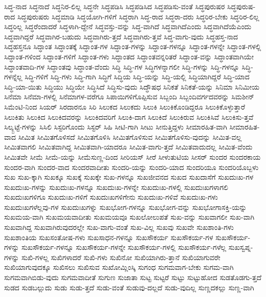 {ಸಿದ್ಧ-ನಾದ
ಸಿದ್ಧನಾದೆ
ಸಿದ್ಧನಿರ-ಲಿಲ್ಲ
ಸಿದ್ಧನೇ
ಸಿದ್ಧಪಡಿಸಿ
ಸಿದ್ಧಪಡಿಸಿದ
ಸಿದ್ಧಪಡಿಸು-ವಂತೆ
ಸಿದ್ಧಪುರುಷರ
ಸಿದ್ಧಪುರುಷ-ರಾದ
ಸಿದ್ಧಪುರುಷರು
ಸಿದ್ಧಮಾಡಿ
ಸಿದ್ಧಯೋಗಿ-ಗಳಿಗೆ
ಸಿದ್ಧರಾಗಿ
ಸಿದ್ಧ-ರಾದ
ಸಿದ್ಧರಾ-ದರು
ಸಿದ್ಧರಿರ-ಬೇಕು
ಸಿದ್ಧರಿರ-ಲಿಲ್ಲ
ಸಿದ್ಧರಿಲ್ಲ
ಸಿದ್ಧರೆಂದಾದರೆ
ಸಿದ್ಧಳಾಗಿ-ದ್ದೇನೆ
ಸಿದ್ಧವಸ್ತು-ವನ್ನು
ಸಿದ್ಧ-ವಾಗಿದೆ
ಸಿದ್ಧವಾಗಿದೆಎಂದು
ಸಿದ್ಧವಾಗಿದೆಯೆಎಂದು
ಸಿದ್ಧವಾಗಿದ್ದರೆ
ಸಿದ್ಧವಾಗಿರ-ಬಹುದು
ಸಿದ್ಧವಾಗಿರು-ತ್ತದೆ
ಸಿದ್ಧವಾಗಿರು-ತ್ತವೆ
ಸಿದ್ಧ-ವಾಗು-ವುದು
ಸಿದ್ಧಹಸ್ತ-ನಾದ
ಸಿದ್ಧಹಸ್ತನೂ
ಸಿದ್ಧಾಂತ
ಸಿದ್ಧಾಂತಕ್ಕೆ
ಸಿದ್ಧಾಂತ-ಗಳ
ಸಿದ್ಧಾಂತ-ಗಳನ್ನು
ಸಿದ್ಧಾಂತ-ಗಳನ್ನೂ
ಸಿದ್ಧಾಂತ-ಗಳನ್ನೇ
ಸಿದ್ಧಾಂತ-ಗಳಲ್ಲಿ
ಸಿದ್ಧಾಂತ-ಗಳಿಂದ
ಸಿದ್ಧಾಂತ-ಗಳಿಗೆ
ಸಿದ್ಧಾಂತ-ಗಳು
ಸಿದ್ಧಾಂತದ
ಸಿದ್ಧಾಂತವನ್ನರಿತರೆ
ಸಿದ್ಧಾಂತ-ವನ್ನು
ಸಿದ್ಧಾಂತವಾಗಿಯೇ
ಸಿದ್ಧಾಂತವಾದಿ-ಗಳ
ಸಿದ್ಧಾಂತವು
ಸಿದ್ಧಾಂತ-ವೆಂದು
ಸಿದ್ಧಿ
ಸಿದ್ಧಿ-ಗಳ
ಸಿದ್ಧಿಗಳನ್ನಾಗಲೀ
ಸಿದ್ಧಿ-ಗಳನ್ನು
ಸಿದ್ಧಿ-ಗಳನ್ನೂ
ಸಿದ್ಧಿ-ಗಳನ್ನೆಲ್ಲ
ಸಿದ್ಧಿ-ಗಳಿಗೆ
ಸಿದ್ಧಿ-ಗಳು
ಸಿದ್ಧಿ-ಗಾಗಿ
ಸಿದ್ಧಿಗೆ
ಸಿದ್ಧಿಯ
ಸಿದ್ಧಿ-ಯನ್ನು
ಸಿದ್ಧಿ-ಯಲ್ಲಿ
ಸಿದ್ಧಿಯಾಗಿದ್ದರೆ
ಸಿದ್ಧಿ-ಯಾದ
ಸಿದ್ಧಿ-ಯಾ-ಯಿತು
ಸಿದ್ಧಿಯು
ಸಿದ್ಧಿಯೇ
ಸಿದ್ಧಿಸಿದೆ
ಸಿದ್ಧಿಸು-ವುದು
ಸಿದ್ಧೌಷಧ
ಸಿನಿಕತೆ
ಸಿನಿಕತೆ-ಯನ್ನು
ಸಿನಿಮಾ
ಸಿನಿಮೀಯ
ಸಿನೆಮಾ
ಸಿನೆಮಾ-ಗಳಲ್ಲಿ
ಸಿನೆಮಾಗಳ-ವರೆಗೂ
ಸಿಪಾಯಿಗಳಿಗೊಪ್ಪಿಸುವ
ಸಿಬ್ಬಂದಿ
ಸಿಬ್ಬಂದಿವರ್ಗದವರನ್ನು
ಸಿಮಶೀನ್
ಸಿಮೆಂಟಿ-ನಿಂದ
ಸಿಯರ್
ಸಿರದಾರನೂ
ಸಿರಿ
ಸಿಲುಕದ
ಸಿಲುಕದು
ಸಿಲುಕಿ
ಸಿಲುಕಿಕೊಂಡಿದ್ದರೂ
ಸಿಲುಕಿಕೊಳ್ಳುತ್ತಾರೆ
ಸಿಲುಕಿತು
ಸಿಲುಕಿದ
ಸಿಲುಕಿದವರನ್ನು
ಸಿಲುಕಿದವರಿಗೆ
ಸಿಲುಕಿ-ದಾಗ
ಸಿಲುಕಿದೆ
ಸಿಲುಕಿರುವ
ಸಿಲುಕಿಸಿವೆ
ಸಿಲುಕಿಸು-ತ್ತವೆ
ಸಿಲ್ಕ್ಬಟ್ಟೆ-ಗಳನ್ನು
ಸಿಸಿಲಿ
ಸಿಸ್ಟರಿಗೊಂದು
ಸಿಸ್ಟರ್
ಸಿಹಿ
ಸೀಟಿ-ಗಾಗಿ
ಸೀಟು
ಸೀನುತ್ತಿದ್ದಳು
ಸೀಮಾರಹಿತ-ವಾಗಿ
ಸೀಮಾರಹಿತ-ವಾದ
ಸೀಮಿತ
ಸೀಮಿತಗೊಳಿಸದೆ
ಸೀಮಿತಗೊಳಿಸಿ
ಸೀಮಿತಗೊಳಿಸುವ
ಸೀಮಿತಗೊಳಿಸು-ವುದನ್ನು
ಸೀಮಿತ-ವಲ್ಲ
ಸೀಮಿತವಾಗಲಿ
ಸೀಮಿತವಾಗಿದ್ದ
ಸೀಮಿತವಾಗಿ-ಯಾದರೂ
ಸೀಮಿತ-ವಾಗು-ತ್ತದೆ
ಸೀಮಿತವಾದುದಲ್ಲ
ಸೀಮಿತ-ವೆಂದು
ಸೀಮಿತವೇ
ಸೀಮೆ
ಸೀಮೆ-ಯನ್ನು
ಸೀಮೆಸುಣ್ಣ-ದಿಂದ
ಸೀರಿಯಸ್
ಸೀರೆ
ಸೀಳುತುಟಿಯ
ಸೀಸರ್
ಸುಂದರ
ಸುಂದರಕಾಯ
ಸುಂದರ-ವಾಗಿ
ಸುಂದರ-ವಾದ
ಸುಂದರವಾದೀತು
ಸುಂದರಿ-ಯನ್ನು
ಸುಂದರಿ-ಯಾದ
ಸುಂದರಿಯೂ
ಸುಂದರಿಯೊಬ್ಬಳು
ಸುಖ
ಸುಖ-ಕ್ಕಾಗಿ
ಸುಖಕ್ಕೂ
ಸುಖಕ್ಕೆ
ಸುಖಕ್ಕೇ
ಸುಖ-ಗಳನ್ನೂ
ಸುಖಜೀವನದ
ಸುಖದ
ಸುಖದಾಸೆಗೆ
ಸುಖದುಃಖ-ಗಳ
ಸುಖದುಃಖ-ಗಳನ್ನು
ಸುಖದುಃಖ-ಗಳನ್ನೂ
ಸುಖದುಃಖ-ಗಳನ್ನೇ
ಸುಖದುಃಖ-ಗಳಲ್ಲಿ
ಸುಖದುಃಖಗಳಾಗಲಿ
ಸುಖದುಃಖಗಳಿಗೂ
ಸುಖದುಃಖ-ಗಳಿಗೆ
ಸುಖದುಃಖಗಳಿಗೇನು
ಸುಖದುಃಖ-ಗಳಿವೆ
ಸುಖದುಃಖ-ಗಳು
ಸುಖದುಃಖಗಳೆಲ್ಲವು-ಗಳ
ಸುಖದುಃಖಗಳ್ನು
ಸುಖಭೋಗ-ಗಳನ್ನೂ
ಸುಖಭೋಗ-ವನ್ನು
ಸುಖಭೋಗಾಸಕ್ತಿ-ಯನ್ನು
ಸುಖಮಯ-ವಾಗಿ
ಸುಖಮಯವಾದೀತು
ಸುಖಮಯವೂ
ಸುಖಲೋಲುಪತೆ
ಸುಖ-ವನ್ನು
ಸುಖವಾಗಲೀ
ಸುಖ-ವಾಗಿ
ಸುಖವಾಗಿದ್ದ
ಸುಖವಾಗಿರುವುದರಲ್ಲೇ
ಸುಖ-ವಾಗು-ವಂತೆ
ಸುಖ-ವಿಲ್ಲ
ಸುಖವು
ಸುಖವೇ
ಸುಖಶಾಂತಿ-ಗಳು
ಸುಖಶಾಂತಿಯ
ಸುಖಸಂತೋಷ-ಗಳು
ಸುಖಸಾಧನ-ಗಳನ್ನೂ
ಸುಖಸೌಕರ್ಯ
ಸುಖಸೌಕರ್ಯ-ಗಳ
ಸುಖಸೌಕರ್ಯ-ಗಳನ್ನು
ಸುಖಸೌಕರ್ಯ-ಗಳನ್ನೂ
ಸುಖಸೌಕರ್ಯ-ಗಳನ್ನೇ
ಸುಖಸೌಕರ್ಯ-ಗಳಲ್ಲಿ
ಸುಖಸೌಕರ್ಯ-ಗಳೆಲ್ಲ
ಸುಖಸ್ವಪ್ನ-ಗಳನ್ನು
ಸುಖಿ-ಗಳಲ್ಲ
ಸುಖಿಗಳಾದರೆ
ಸುಖಿ-ಗಳು
ಸುಖಿನೋ
ಸುಖಿಯಾಗಿರು-ತ್ತಾನೆ
ಸುಖಿಯಾಗುವರೇ
ಸುಖಿಯಾಗುವುದಕ್ಕೂ
ಸುಖಿಸಲು
ಸುಖಿಸುವ
ಸುಖೋಮ್ಲಿಂಸ್ಕಿ
ಸುಗಂಧ
ಸುಗಮವಾಗ-ಬೇಕು
ಸುಗಮ-ವಾಗಿ
ಸುಗಮವಾಗಿಬಿಡು-ವುದು
ಸುಗಮವಾದೀತೆ
ಸುಗುಣ
ಸುಜಾತಾ
ಸುಟ್ಟ
ಸುಟ್ಟರೆ
ಸುಟ್ಟು
ಸುಟ್ಟುಹೋದ
ಸುಡತೊಡಗು-ತ್ತದೆ
ಸುಡದ
ಸುಡಬಲ್ಲುದು
ಸುಡು
ಸುಡು-ತ್ತದೆ
ಸುಡು-ವಂತೆ
ಸುಡುವು-ದಲ್ಲದೆ
ಸುಡು-ವುದಿಲ್ಲ
ಸುಣ್ಣದಕಲ್ಲು
ಸುಣ್ಣ-ವಾಗಿ
}
